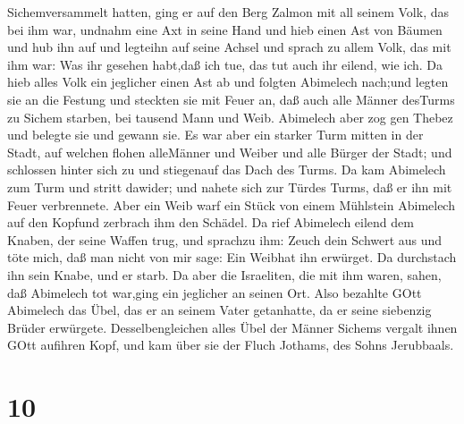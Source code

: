 Sichemversammelt hatten,  ging er auf den Berg Zalmon mit
all seinem Volk, das bei ihm war, undnahm eine Axt in seine Hand und
hieb einen Ast von Bäumen und hub ihn auf und legteihn auf seine Achsel
und sprach zu allem Volk, das mit ihm war: Was ihr gesehen habt,daß ich
tue, das tut auch ihr eilend, wie ich.  Da hieb alles Volk
ein jeglicher einen Ast ab und folgten Abimelech nach;und legten sie an
die Festung und steckten sie mit Feuer an, daß auch alle Männer desTurms
zu Sichem starben, bei tausend Mann und Weib.  Abimelech
aber zog gen Thebez und belegte sie und gewann sie.  Es war
aber ein starker Turm mitten in der Stadt, auf welchen flohen alleMänner
und Weiber und alle Bürger der Stadt; und schlossen hinter sich zu und
stiegenauf das Dach des Turms.  Da kam Abimelech zum Turm
und stritt dawider; und nahete sich zur Türdes Turms, daß er ihn mit
Feuer verbrennete.  Aber ein Weib warf ein Stück von einem
Mühlstein Abimelech auf den Kopfund zerbrach ihm den Schädel.
 Da rief Abimelech eilend dem Knaben, der seine Waffen
trug, und sprachzu ihm: Zeuch dein Schwert aus und töte mich, daß man
nicht von mir sage: Ein Weibhat ihn erwürget. Da durchstach ihn sein
Knabe, und er starb.  Da aber die Israeliten, die mit ihm
waren, sahen, daß Abimelech tot war,ging ein jeglicher an seinen Ort.
 Also bezahlte GOtt Abimelech das Übel, das er an seinem
Vater getanhatte, da er seine siebenzig Brüder erwürgete. 
Desselbengleichen alles Übel der Männer Sichems vergalt ihnen GOtt
aufihren Kopf, und kam über sie der Fluch Jothams, des Sohns Jerubbaals.

\hypertarget{section-9}{%
\section{10}\label{section-9}}

